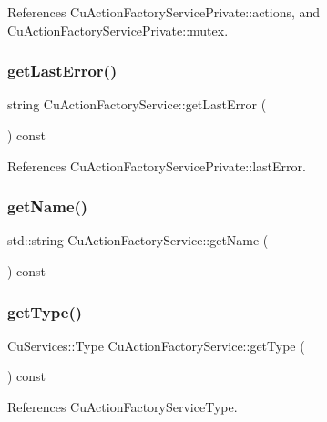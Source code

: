 References Cu\+Action\+Factory\+Service\+Private\+::actions, and Cu\+Action\+Factory\+Service\+Private\+::mutex.

\mbox{\label{classCuActionFactoryService_ad6eda198d36413ff1e5c45f4ec96cc9a}} 
\subsubsection{get\+Last\+Error()}
{\footnotesize\ttfamily string Cu\+Action\+Factory\+Service\+::get\+Last\+Error (\begin{DoxyParamCaption}{ }\end{DoxyParamCaption}) const}



References Cu\+Action\+Factory\+Service\+Private\+::last\+Error.

\mbox{\label{classCuActionFactoryService_aa13ec3fcb56035e6f8a9137f1b2d3b6a}} 
\subsubsection{get\+Name()}
{\footnotesize\ttfamily std\+::string Cu\+Action\+Factory\+Service\+::get\+Name (\begin{DoxyParamCaption}{ }\end{DoxyParamCaption}) const}

\mbox{\label{classCuActionFactoryService_a1ec587dda23b3cdfdcc7b78b170ed7e3}} 
\subsubsection{get\+Type()}
{\footnotesize\ttfamily Cu\+Services\+::\+Type Cu\+Action\+Factory\+Service\+::get\+Type (\begin{DoxyParamCaption}{ }\end{DoxyParamCaption}) const}



References Cu\+Action\+Factory\+Service\+Type.

\mbox{\label{classCuActionFactoryService_adb063732f244608930bdd1961ddcc33c}} 
